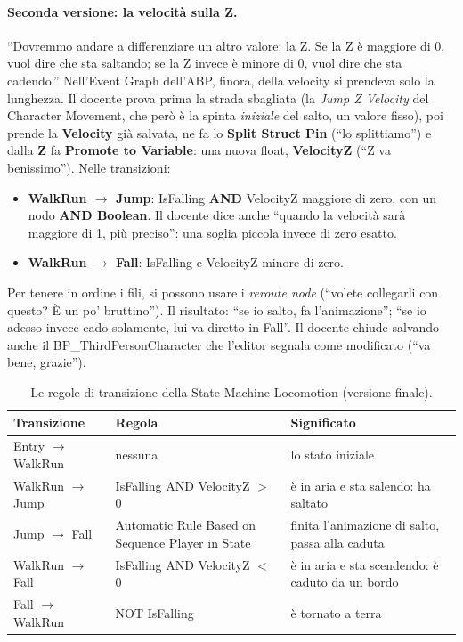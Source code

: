 \paragraph{Seconda versione: la velocità sulla Z.} ``Dovremmo andare a differenziare un
altro valore: la Z. Se la Z è maggiore di 0, vuol dire che sta saltando; se la Z invece è
minore di 0, vuol dire che sta cadendo.'' Nell'Event Graph dell'ABP, finora, della
velocity si prendeva solo la lunghezza. Il docente prova prima la strada sbagliata (la
\emph{Jump Z Velocity} del Character Movement, che però è la spinta \emph{iniziale} del
salto, un valore fisso), poi prende la \textbf{Velocity} già salvata, ne fa lo
\textbf{Split Struct Pin} (``lo splittiamo'') e dalla \textbf{Z} fa \textbf{Promote to
Variable}: una nuova float, \textbf{VelocityZ} (``Z va benissimo''). Nelle transizioni:
\begin{itemize}
  \item \textbf{WalkRun $\rightarrow$ Jump}: IsFalling \textbf{AND} VelocityZ maggiore
        di zero, con un nodo \textbf{AND Boolean}. Il docente dice anche ``quando la
        velocità sarà maggiore di 1, più preciso'': una soglia piccola invece di zero
        esatto.
  \item \textbf{WalkRun $\rightarrow$ Fall}: IsFalling e VelocityZ minore di zero.
\end{itemize}
Per tenere in ordine i fili, si possono usare i \emph{reroute node} (``volete collegarli
con questo? È un po' bruttino''). Il risultato: ``se io salto, fa l'animazione''; ``se io
adesso invece cado solamente, lui va diretto in Fall''. Il docente chiude salvando anche
il BP\_ThirdPersonCharacter che l'editor segnala come modificato (``va bene, grazie'').

\begin{table}[htbp]
\centering
\small
\begin{tabular}{@{}p{3.2cm}p{5.3cm}p{5.5cm}@{}}
\toprule
\textbf{Transizione} & \textbf{Regola} & \textbf{Significato} \\
\midrule
Entry $\rightarrow$ WalkRun & nessuna & lo stato iniziale \\
WalkRun $\rightarrow$ Jump & IsFalling AND VelocityZ $>$ 0 & è in aria e sta salendo: ha
saltato \\
Jump $\rightarrow$ Fall & Automatic Rule Based on Sequence Player in State & finita
l'animazione di salto, passa alla caduta \\
WalkRun $\rightarrow$ Fall & IsFalling AND VelocityZ $<$ 0 & è in aria e sta scendendo:
è caduto da un bordo \\
Fall $\rightarrow$ WalkRun & NOT IsFalling & è tornato a terra \\
\bottomrule
\end{tabular}
\caption{Le regole di transizione della State Machine Locomotion (versione finale).}
\label{ue9:tab:transizioni}
\end{table}

